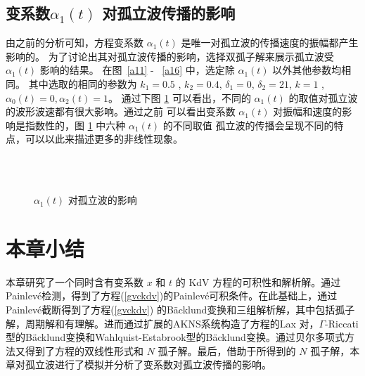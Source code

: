 \subsection{变系数$ \alpha_1(t) $ 对孤立波传播的影响}
由之前的分析可知，方程变系数 $ \alpha_1(t) $ 是唯一对孤立波的传播速度的振幅都产生影响的。
为了讨论出其对孤立波传播的影响，选择双孤子解来展示孤立波受 $ \alpha_1(t) $ 影响的结果。
在图~\ref{a11} - ~\ref{a16} 中，选定除 $ \alpha_1(t) $ 以外其他参数均相同。
其中选取的相同的参数为 $k_1=0.5$ , $k_2=0.4$, $\delta_1=0$, $\delta_2=21$, $k=1$ , $\alpha_0(t)=0, \alpha_2(t)=1$。
通过下图 \ref{a1} 可以看出，不同的 $ \alpha_1(t) $ 的取值对孤立波的波形波速都有很大影响。通过之前
可以看出变系数 $ \alpha_1(t) $ 对振幅和速度的影响是指数性的，图 \ref{a1} 中六种 $ \alpha_1(t) $ 的不同取值
孤立波的传播会呈现不同的特点，可以以此来描述更多的非线性现象。
\begin{figure}[H]
\centering
{}
\qquad
{}\\
\qquad
{}
\centering
{}\\
\qquad
{}
\qquad
{}
\caption{$\alpha_1(t)$ 对孤立波的影响}
\label{a1}
\end{figure}

\section{本章小结}
本章研究了一个同时含有变系数 $x$ 和 $t$ 的 KdV 方程的可积性和解析解。通过Painlev\'{e}检测，得到了方程(\ref{gvckdv})的Painlev\'{e}可积条件。在此基础上，通过Painlev\'{e}截断得到了方程(\ref{gvckdv}) 的B\"{a}cklund变换和三组解析解，其中包括孤子解，周期解和有理解。进而通过扩展的AKNS系统构造了方程的Lax 对，$\Gamma$-Riccati型的B\"{a}cklund变换和Wahlquist-Estabrook型的B\"{a}cklund变换。通过贝尔多项式方法又得到了方程的双线性形式和 $N$ 孤子解。最后，借助于所得到的 $N$ 孤子解，本章对孤立波进行了模拟并分析了变系数对孤立波传播的影响。



